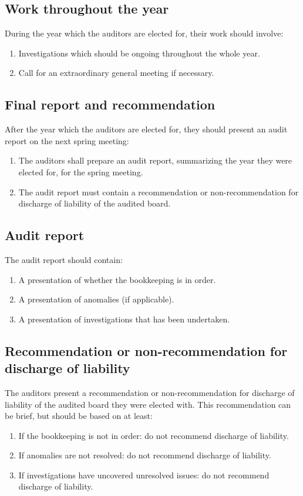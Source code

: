 \subsection{Work throughout the year} \label{sec:auditorYear}
During the year which the auditors are elected for, their work should involve:
\begin{enumerate}
  \item Investigations which should be ongoing throughout the whole year.
  \item Call for an extraordinary general meeting if necessary.
\end{enumerate}

\subsection{Final report and recommendation} \label{sec:finalReport}
After the year which the auditors are elected for, they should present an audit report on the next spring meeting:
\begin{enumerate}
  \item The auditors shall prepare an audit report, summarizing the year they were elected for, for the spring meeting. 
  \item The audit report must contain a recommendation or non-recommendation for discharge of liability of the audited board.
\end{enumerate}

\subsection{Audit report}
The audit report should contain:
\begin{enumerate}
  \item A presentation of whether the bookkeeping is in order.
  \item A presentation of anomalies (if applicable).
  \item A presentation of investigations that has been undertaken.
\end{enumerate}

\subsection{Recommendation or non-recommendation for discharge of liability}
The auditors present a recommendation or non-recommendation for discharge of liability of the audited board they were elected with.
This recommendation can be brief, but should be based on at least:
\begin{enumerate}
  \item If the bookkeeping is not in order: do not recommend discharge of liability.
  \item If anomalies are not resolved: do not recommend discharge of liability.
  \item If investigations have uncovered unresolved issues: do not recommend discharge of liability.
\end{enumerate}

